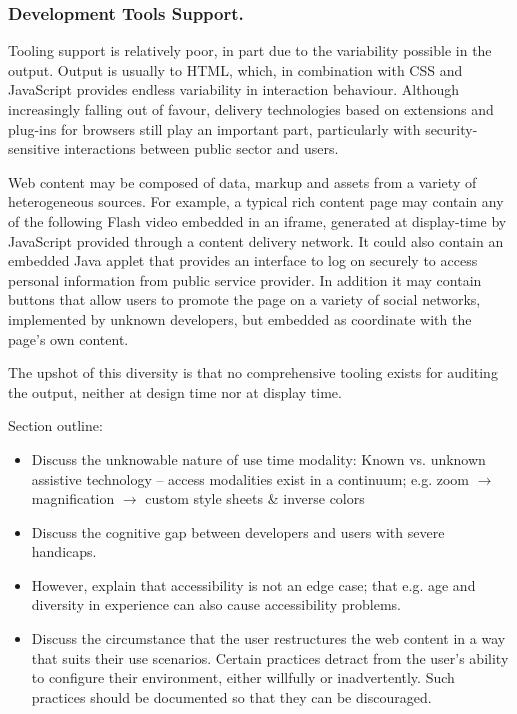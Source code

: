 \subsubsection{Development Tools Support.} %
	\label{ssub:development_tools_support_}
	Tooling support is relatively poor, in part due to the variability possible in the output. Output is usually to HTML, which, in combination with CSS and JavaScript provides endless variability in interaction behaviour. Although increasingly falling out of favour, delivery technologies based on extensions and plug-ins for browsers still play an important part, particularly with security-sensitive interactions between public sector and users.

	Web content may be composed of data, markup and assets from a variety of heterogeneous sources. For example, a typical rich content page may contain any of the following Flash video embedded in an iframe, generated at display-time by JavaScript provided through a content delivery network. It could also contain an embedded Java applet that provides an interface to log on securely to access personal information from public service provider. In addition it may contain buttons that allow users to promote the page on a variety of social networks, implemented by unknown developers, but embedded as coordinate with the page's own content.

	The upshot of this diversity is that no comprehensive tooling exists for auditing the output, neither at design time nor at display time.


Section outline:

\begin{itemize}
	\item Discuss the unknowable nature of use time modality: Known vs. unknown assistive technology -- access modalities exist in a continuum; e.g. zoom $\rightarrow$ magnification $\rightarrow$ custom style sheets \& inverse colors
	\item Discuss the cognitive gap between developers and users with severe handicaps.
	\item However, explain that accessibility is not an edge case; that e.g. age and diversity in experience can also cause accessibility problems.
	\item Discuss the circumstance that the user restructures the web content in a way that suits their use scenarios. Certain practices detract from the user's ability to configure their environment, either willfully or inadvertently. Such practices should be documented so that they can be discouraged.
\end{itemize}

